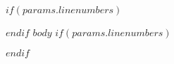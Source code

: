 \documentclass[11pt,a4paper,$params.lang$,
$for(classoption)$
  $classoption$$sep$,
$endfor$$if(subclass)$,$subclass$$endif$]{exam}
\begin{document}
$if(params.linenumbers)$\begin{linenumbers}$endif$
$body$
$if(params.linenumbers)$\end{linenumbers}$endif$
\end{document}
